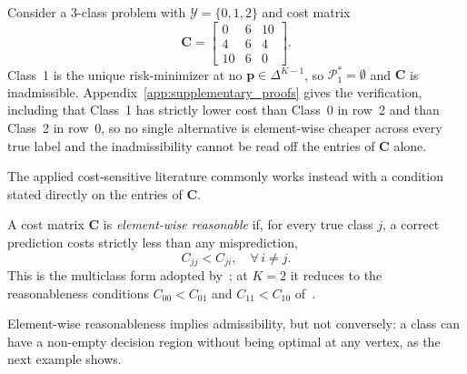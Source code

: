 \begin{example}\label{ex:inadmissible}
    Consider a 3-class problem with $\mathcal{Y}=\{0, 1, 2\}$ and cost matrix
    \begin{equation}
        \mathbf{C} = \begin{bmatrix}
            0 & 6 & 10 \\
            4 & 6 & 4 \\
            10 & 6 & 0
        \end{bmatrix}.
    \end{equation}
    Class~1 is the unique risk-minimizer at no $\mathbf{p} \in \Delta^{K-1}$, so $\mathcal{P}_1^* = \emptyset$ and $\mathbf{C}$ is inadmissible. Appendix~\ref{app:supplementary_proofs} gives the verification, including that Class~1 has strictly lower cost than Class~0 in row~2 and than Class~2 in row~0, so no single alternative is element-wise cheaper across every true label and the inadmissibility cannot be read off the entries of $\mathbf{C}$ alone.
\end{example}

The applied cost-sensitive literature commonly works instead with a condition stated directly on the entries of $\mathbf{C}$.

\begin{definition}\label{def:elementwise}
    A cost matrix $\mathbf{C}$ is \emph{element-wise reasonable} if, for every true class $j$, a correct prediction costs strictly less than any misprediction,
    \begin{equation}
        C_{jj} < C_{ji}, \quad \forall\, i \neq j.
    \end{equation}
    This is the multiclass form adopted by~\citet{obrien2008costsensitive}; at $K = 2$ it reduces to the reasonableness conditions $C_{00} < C_{01}$ and $C_{11} < C_{10}$ of~\citet{elkan2001foundations}.
\end{definition}

Element-wise reasonableness implies admissibility, but not conversely: a class can have a non-empty decision region without being optimal at any vertex, as the next example shows.

